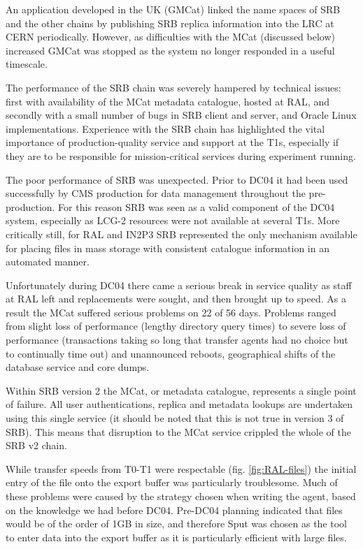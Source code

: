 \documentclass{cmspaper}
\begin{document}
An application developed in the UK (GMCat) linked the name spaces of SRB and the other chains by publishing SRB replica information into the LRC at CERN periodically. However, as difficulties with the MCat (discussed below) increased GMCat was stopped as the system no longer responded in a useful timescale.

The performance of the SRB chain was severely hampered by technical issues: first with availability of the MCat metadata catalogue, hosted at RAL, and secondly with a small number of bugs in SRB client and server, and Oracle Linux implementations. Experience with the SRB chain has highlighted the vital importance of production-quality service and support at the T1s, especially if they are to be responsible for mission-critical services during experiment running.

The poor performance of SRB was unexpected. Prior to DC04 it had been used successfully by CMS production for data management throughout the pre-production.
For this reason SRB was seen as a valid component of the DC04 system, especially as LCG-2 resources were not available at several T1s. 
More critically still, for RAL and IN2P3 SRB represented the only mechanism available for placing files in mass storage with consistent catalogue information in an automated manner.

Unfortunately during DC04 there came a serious break in service quality as staff at RAL left and replacements were sought, and then brought up to speed.  As a result the MCat suffered serious problems on 22 of 56 days. Problems ranged from slight loss of performance (lengthy directory query times) to severe loss of performance (transactions taking so long that transfer agents had no choice but  to continually time out) and unannounced reboots, geographical shifts of the database service and core dumps.

Within SRB version 2 the MCat, or metadata catalogue, represents a single point of failure. All user authentications, replica and metadata lookups are undertaken using this single service (it should be noted that this is not true in version 3 of SRB). This means that disruption to the MCat service crippled the whole of the SRB v2 chain.

While transfer speeds from T0-T1 were respectable (fig. \ref{fig:RAL-files}) the initial entry of the file onto the export buffer was particularly troublesome.  Much of these problems were caused by the strategy chosen when writing the agent, based on the knowledge we had before DC04. Pre-DC04 planning indicated that files would be of the order of 1GB in size, and therefore Sput was chosen as the tool to enter data into the export buffer as it is particularly efficient with large files.
\end{document}
